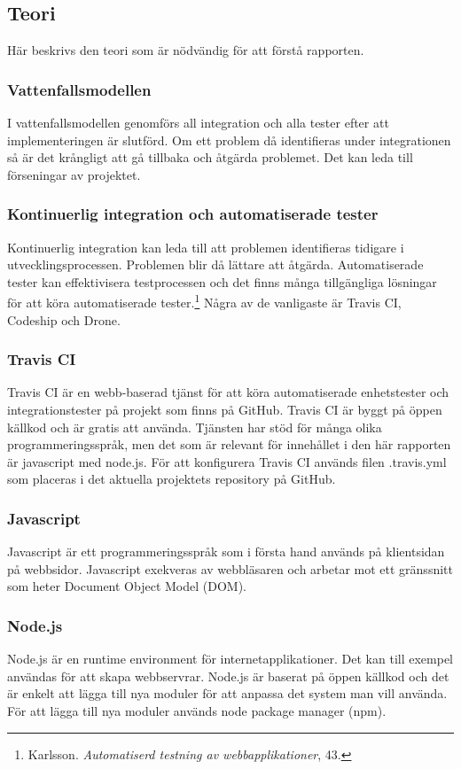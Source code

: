 \subsection{Teori}
Här beskrivs den teori som är nödvändig för att förstå rapporten.

\subsubsection{Vattenfallsmodellen}
I vattenfallsmodellen genomförs all integration och alla tester efter att implementeringen är slutförd. 
Om ett problem då identifieras under integrationen så är det krångligt att gå tillbaka och åtgärda problemet. 
Det kan leda till förseningar av projektet.

\subsubsection{Kontinuerlig integration och automatiserade tester}
Kontinuerlig integration kan leda till att problemen identifieras tidigare i 
utvecklingsprocessen. Problemen blir då lättare att åtgärda. Automatiserade tester kan effektivisera 
testprocessen och det finns många tillgängliga lösningar för att köra automatiserade
tester.\footnote{Karlsson. \textit{Automatiserd testning av webbapplikationer}, 43.} 
Några av de vanligaste är Travis CI, Codeship och Drone.

\subsubsection{Travis CI}
Travis CI är en webb-baserad tjänst för att köra automatiserade enhetstester och integrationstester
på projekt som finns på GitHub. Travis CI är byggt på öppen källkod och är gratis att använda. 
Tjänsten har stöd för många olika programmeringsspråk, men det som är relevant för innehållet i den här rapporten
är javascript med node.js. För att konfigurera Travis CI används filen .travis.yml som placeras i det aktuella
projektets repository på GitHub.

\subsubsection{Javascript}
Javascript är ett programmeringsspråk som i första hand används på klientsidan på webbsidor.
Javascript exekveras av webbläsaren och arbetar mot ett gränssnitt som heter Document Object Model (DOM).

\subsubsection{Node.js}
Node.js är en runtime environment för internetapplikationer. Det kan till exempel användas för att skapa webbservrar.
Node.js är baserat på öppen källkod och det är enkelt att lägga till nya moduler för att anpassa det system man vill
använda. För att lägga till nya moduler används node package manager (npm).

